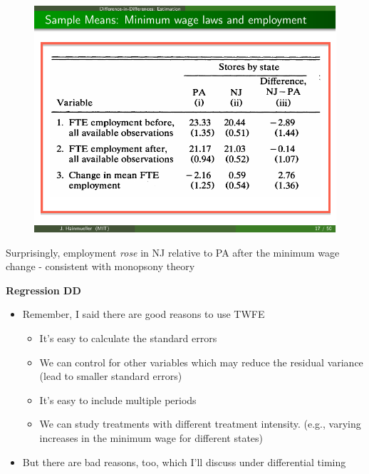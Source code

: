 \documentclass[notes=show]{beamer}
\begin{document}
\begin{frame}[plain]
	\begin{figure}
	\includegraphics{./lecture_includes/ck_fig1.pdf}
	\end{figure}
	
	Surprisingly, employment \emph{rose} in NJ relative to PA after the minimum wage change - consistent with monopsony theory
\end{frame}


\begin{frame}[plain]
	\begin{center}
	\textbf{Regression DD}
	\end{center}
	
	\begin{itemize}
	\item Remember, I said there are good reasons to use TWFE
		\begin{itemize}
		\item It's easy to calculate the standard errors
		\item We can control for other variables which may reduce the residual variance (lead to smaller standard errors)
		\item It's easy to include multiple periods
		\item We can study treatments with different treatment intensity. (e.g., varying increases in the minimum wage for different states)
		\end{itemize}
	\item But there are bad reasons, too, which I'll discuss under differential timing
	\end{itemize}
\end{frame}
\end{document}
